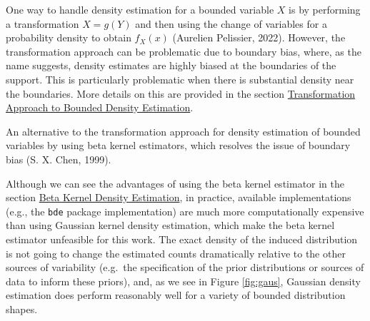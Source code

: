 \documentclass[12pt,twoside]{smiththesis}
\begin{document}
One way to handle density estimation for a bounded variable \(X\) is by performing a transformation
\(X=g(Y)\) and then using the change of variables for a probability density to obtain \(f_X(x)\) (Aurelien Pelissier, 2022). However, the transformation approach can be problematic due to boundary bias, where, as the name suggests, density estimates are highly biased at the boundaries of the support. This is particularly problematic when there is substantial density near the boundaries. More details on this are provided in the section \protect\hyperlink{bounded-density-transform}{Transformation Approach to Bounded Density Estimation}.

An alternative to the transformation approach for density estimation of bounded variables by using beta kernel estimators, which resolves the issue of boundary bias (S. X. Chen, 1999).

Although we can see the advantages of using the beta kernel estimator in the section \protect\hyperlink{betakernel}{Beta Kernel Density Estimation}, in practice, available implementations (e.g., the \texttt{bde} package implementation) are much more computationally expensive than using Gaussian kernel density estimation, which make the beta kernel estimator unfeasible for this work. The exact density of the induced distribution is not going to change the estimated counts dramatically relative to the other sources of variability (e.g.~the specification of the prior distributions or sources of data to inform these priors), and, as we see in Figure \ref{fig:gaus}, Gaussian density estimation does perform reasonably well for a variety of bounded distribution shapes.

~ ~ ~ ~ ~ ~ ~ ~ ~ ~
\end{document}
